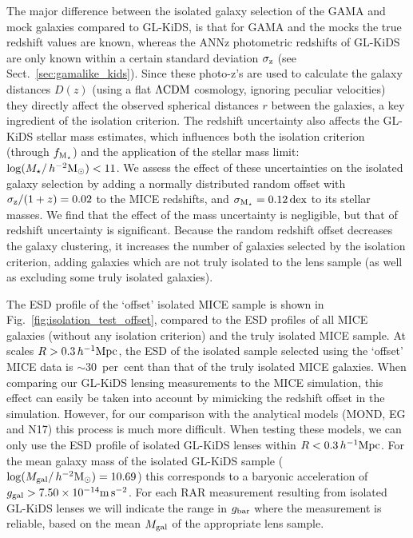 \documentclass[usenatbib]{mnras}
\newcommand{\hmsun}{\,h^{-2} {\rm M_\odot}}
\newcommand{\hMpc}{\, h^{-1}{\rm{Mpc}} }
\newcommand{\mpss}{ {\rm m}\,{\rm s}^{-2} }
\newcommand{\lcdm}{{\rm \Lambda CDM}}
\newcommand*{\E}[1]{\times 10^{#1}}
\newcommand{\un}[1]{_{\rm #1}}
\newcommand{\dex}{\, {\rm dex}}
\begin{document}
The major difference between the isolated galaxy selection of the GAMA and mock galaxies compared to GL-KiDS, is that for GAMA and the mocks the true redshift values are known, whereas the ANNz photometric redshifts of GL-KiDS are only known within a certain standard deviation $\sigma\un{z}$ (see Sect.~\ref{sec:gamalike_kids}). Since these photo-z's are used to calculate the galaxy distances $D(z)$ (using a flat $\lcdm$ cosmology, ignoring peculiar velocities) they directly affect the observed spherical distances $r$ between the galaxies, a key ingredient of the isolation criterion. The redshift uncertainty also affects the GL-KiDS stellar mass estimates, which influences both the isolation criterion (through $f\un{M_\star}$) and the application of the stellar mass limit: $\log(M_\star/\hmsun) < 11$. We assess the effect of these uncertainties on the isolated galaxy selection by adding a normally distributed random offset with $\sigma\un{z}/(1+z) = 0.02$ to the MICE redshifts, and $\sigma\un{M_\star} = 0.12 \dex$ to its stellar masses. We find that the effect of the mass uncertainty is negligible, but that of redshift uncertainty is significant. Because the random redshift offset decreases the galaxy clustering, it increases the number of galaxies selected by the isolation criterion, adding galaxies which are not truly isolated to the lens sample (as well as excluding some truly isolated galaxies). %

The ESD profile of the `offset' isolated MICE sample is shown in Fig.~\ref{fig:isolation_test_offset}, compared to the ESD profiles of all MICE galaxies (without any isolation criterion) and the truly isolated MICE sample. At scales $R > 0.3 \hMpc$, the ESD of the isolated sample selected using the `offset' MICE data is $\sim 30$~per~cent than that of the truly isolated MICE galaxies. When comparing our GL-KiDS lensing measurements to the MICE simulation, this effect can easily be taken into account by mimicking the redshift offset in the simulation. However, for our comparison with the analytical models (MOND, EG and N17) this process is much more difficult. When testing these models, we can only use the ESD profile of isolated GL-KiDS lenses within $R < 0.3 \hMpc$. For the mean galaxy mass of the isolated GL-KiDS sample ($\log(M\un{gal}/\hmsun) = 10.69$) this corresponds to a baryonic acceleration of $g\un{gal}>7.50\E{-14} \mpss$. For each RAR measurement resulting from isolated GL-KiDS lenses we will indicate the range in $g\un{bar}$ where the measurement is reliable, based on the mean $M\un{gal}$ of the appropriate lens sample.
\end{document}

